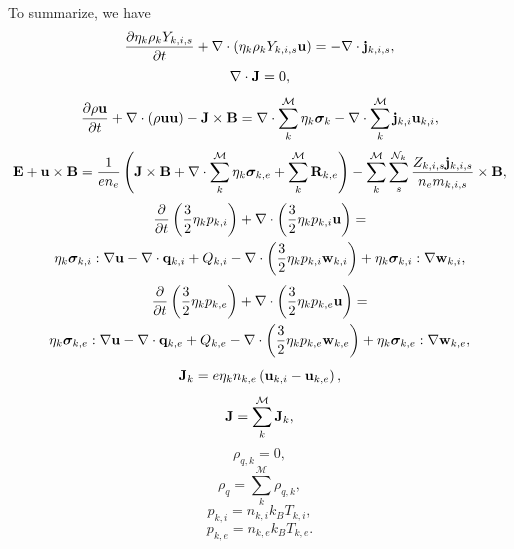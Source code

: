 \documentclass[a4paper,11pt]{report}
\begin{document}
To summarize, we have
\begin{equation}
    \label{eq:sf_mm_ms_ni}
    \frac{\partial \eta_k \rho_k Y_{k,i,s}}{\partial t} + \nabla \cdot \left( \eta_k \rho_k Y_{k,i,s} \mathbf{u} \right) = -\nabla \cdot \mathbf{j}_{k,i,s},
\end{equation}
\begin{equation}
    \label{eq:sf_mm_ms_ne}
    \nabla \cdot \mathbf{J} = 0,
\end{equation}
\begin{equation}
    \label{eq:sf_mm_ms_ui}
    \frac{\partial \rho \mathbf{u}}{\partial t} + \nabla \cdot \left( \rho \mathbf{u} \mathbf{u} \right) - \mathbf{J} \times \mathbf{B} = \nabla \cdot \sum_k^\mathcal{M} \eta_k \bm \sigma_k - \nabla \cdot \sum_k^\mathcal{M} \mathbf{j}_{k,i} \mathbf{u}_{k,i},
\end{equation}
\begin{equation}
    \label{eq:sf_mm_ms_ue}
    \mathbf{E} + \mathbf{u} \times \mathbf{B} = \frac{1}{e n_e} \left( \mathbf{J} \times \mathbf{B} + \nabla \cdot \sum_k^\mathcal{M} \eta_k \bm \sigma_{k,e} + \sum_k^\mathcal{M} \mathbf{R}_{k,e} \right) - \sum_k^\mathcal{M} \sum_s^{\mathcal{N}_k} \frac{Z_{k,i,s} \mathbf{j}_{k,i,s}}{n_e m_{k,i,s}} \times \mathbf{B},
\end{equation}
\begin{multline}
    \label{eq:sf_mm_ms_iei}
    \frac{\partial}{\partial t} \left( \frac{3}{2} \eta_k p_{k,i} \right) + \nabla \cdot \left( \frac{3}{2} \eta_k p_{k,i} \mathbf{u} \right) = \\
    \eta_k \bm \sigma_{k,i} : \nabla \mathbf{u} - \nabla \cdot \mathbf{q}_{k,i} + Q_{k,i} - \nabla \cdot \left( \frac{3}{2} \eta_k p_{k,i} \mathbf{w}_{k,i} \right) + \eta_k \bm \sigma_{k,i} : \nabla \mathbf{w}_{k,i},
\end{multline}
\begin{multline}
    \label{eq:sf_mm_ms_iee}
    \frac{\partial}{\partial t} \left( \frac{3}{2} \eta_k p_{k,e} \right) + \nabla \cdot \left( \frac{3}{2} \eta_k p_{k,e} \mathbf{u} \right) = \\
    \eta_k \bm \sigma_{k,e} : \nabla \mathbf{u} - \nabla \cdot \mathbf{q}_{k,e} + Q_{k,e} - \nabla \cdot \left( \frac{3}{2} \eta_k p_{k,e} \mathbf{w}_{k,e} \right) + \eta_k \bm \sigma_{k,e} : \nabla \mathbf{w}_{k,e},
\end{multline}
\begin{equation}
    \label{eq:sf_mm_ms_curr_density}
    \mathbf{J}_k = e \eta_k n_{k,e} \left( \mathbf{u}_{k,i} - \mathbf{u}_{k,e} \right),
\end{equation}
\begin{equation}
    \mathbf{J} = \sum_k^\mathcal{M} \mathbf{J}_k,
\end{equation}
\begin{equation}
    \label{eq:sf_mm_ms_mass_density}
    \rho_{q,k} = 0,
\end{equation}
\begin{equation}
    \rho_q = \sum_k^\mathcal{M} \rho_{q,k},
\end{equation}
\begin{equation}
    \label{eq:sf_mm_ms_eos_ion}
    p_{k,i} = n_{k,i} k_B T_{k,i},
\end{equation}
\begin{equation}
    \label{eq:sf_mm_ms_eos_elec}
    p_{k,e} = n_{k,e} k_B T_{k,e}.
\end{equation}
\end{document}
